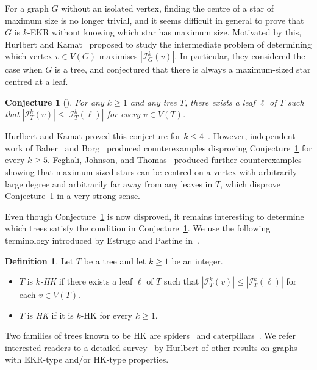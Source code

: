 \documentclass[11pt]{article}
\newtheorem{conjecture}[theorem]{Conjecture}
\theoremstyle{definition}
\newtheorem{definition}[theorem]{Definition}
\newcommand{\cI}{\mathcal{I}}
\begin{document}


For a graph $G$ without an isolated vertex, finding the centre of a star of maximum size is no longer trivial, and it seems difficult in general to prove that $G$ is $k$-EKR without knowing which star has maximum size. Motivated by this, Hurlbert and Kamat~\cite{HK} proposed to study the intermediate problem of determining which vertex $v\in V(G)$ maximises $|\cI^k_G(v)|$. In particular, they considered the case when $G$ is a tree, and conjectured that there is always a maximum-sized star centred at a leaf. 
\begin{conjecture}[\cite{HK}]\label{conj:HK}
For any $k\ge1$ and any tree $T$, there exists a leaf $\ell$ of $T$ such that $|\mathcal{I}_{T}^{k}(v)|\le|\mathcal{I}_{T}^{k}(\ell)|$ for every $v\in V(T)$.
\end{conjecture}

Hurlbert and Kamat proved this conjecture for $k\le4$~\cite{HK}. However, independent work of Baber~\cite{Baber} and Borg~\cite{Borg} produced counterexamples disproving Conjecture~\ref{conj:HK} for every $k\geq5$. Feghali, Johnson, and Thomas~\cite{FJT} produced further counterexamples showing that maximum-sized stars can be centred on a vertex with arbitrarily large degree and arbitrarily far away from any leaves in $T$, which disprove Conjecture~\ref{conj:HK} in a very strong sense. 

Even though Conjecture~\ref{conj:HK} is now disproved, it remains interesting to determine which trees satisfy the condition in Conjecture~\ref{conj:HK}. We use the following terminology introduced by Estrugo and Pastine in~\cite{EP}.
\begin{definition}
Let $T$ be a tree and let $k\geq1$ be an integer. 
\begin{itemize}
    \item $T$ is \textit{$k$-HK} if there exists a leaf $\ell$ of $T$ such that $|\mathcal{I}_{T}^{k}(v)|\le|\mathcal{I}_{T}^{k}(\ell)|$ for each $v\in V(T)$.
    \item $T$ is \textit{HK} if it is $k$-HK for every $k\geq1$.
\end{itemize}
\end{definition}
Two families of trees known to be HK are spiders~\cite{HK2} and caterpillars~\cite{EP}. We refer interested readers to a detailed survey~\cite{H} by Hurlbert of other results on graphs with EKR-type and/or HK-type properties.
\end{document}
